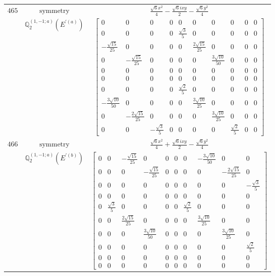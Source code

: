 \documentclass[fleqn,8pt,landscape]{jsarticle}
\begin{document}
\begin{longtable}{ccc}
$ 465 $ & $ \text{symmetry} $ & $ \frac{\sqrt{6} x^{2}}{4} - \frac{\sqrt{6} i x y}{2} - \frac{\sqrt{6} y^{2}}{4} $ \\
$  $ & $ \mathbb{Q}_{2}^{(1,-1;a)}(E^{\prime(a)}) $ & $ \begin{bmatrix} 0 & 0 & 0 & 0 & 0 & 0 & 0 & 0 & 0 & 0 \\ 0 & 0 & 0 & 0 & \frac{\sqrt{3}}{5} & 0 & 0 & 0 & 0 & 0 \\ - \frac{\sqrt{15}}{25} & 0 & 0 & 0 & 0 & \frac{2 \sqrt{15}}{25} & 0 & 0 & 0 & 0 \\ 0 & - \frac{\sqrt{15}}{25} & 0 & 0 & 0 & 0 & \frac{3 \sqrt{10}}{50} & 0 & 0 & 0 \\ 0 & 0 & 0 & 0 & 0 & 0 & 0 & 0 & 0 & 0 \\ 0 & 0 & 0 & 0 & 0 & 0 & 0 & 0 & 0 & 0 \\ 0 & 0 & 0 & 0 & \frac{\sqrt{2}}{5} & 0 & 0 & 0 & 0 & 0 \\ - \frac{3 \sqrt{10}}{50} & 0 & 0 & 0 & 0 & \frac{3 \sqrt{10}}{25} & 0 & 0 & 0 & 0 \\ 0 & - \frac{2 \sqrt{15}}{25} & 0 & 0 & 0 & 0 & \frac{3 \sqrt{10}}{25} & 0 & 0 & 0 \\ 0 & 0 & - \frac{\sqrt{3}}{5} & 0 & 0 & 0 & 0 & \frac{\sqrt{2}}{5} & 0 & 0 \end{bmatrix} $ \\ \hline
$ 466 $ & $ \text{symmetry} $ & $ \frac{\sqrt{6} x^{2}}{4} + \frac{\sqrt{6} i x y}{2} - \frac{\sqrt{6} y^{2}}{4} $ \\
$  $ & $ \mathbb{Q}_{2}^{(1,-1;a)}(E^{\prime(b)}) $ & $ \begin{bmatrix} 0 & 0 & - \frac{\sqrt{15}}{25} & 0 & 0 & 0 & 0 & - \frac{3 \sqrt{10}}{50} & 0 & 0 \\ 0 & 0 & 0 & - \frac{\sqrt{15}}{25} & 0 & 0 & 0 & 0 & - \frac{2 \sqrt{15}}{25} & 0 \\ 0 & 0 & 0 & 0 & 0 & 0 & 0 & 0 & 0 & - \frac{\sqrt{3}}{5} \\ 0 & 0 & 0 & 0 & 0 & 0 & 0 & 0 & 0 & 0 \\ 0 & \frac{\sqrt{3}}{5} & 0 & 0 & 0 & 0 & \frac{\sqrt{2}}{5} & 0 & 0 & 0 \\ 0 & 0 & \frac{2 \sqrt{15}}{25} & 0 & 0 & 0 & 0 & \frac{3 \sqrt{10}}{25} & 0 & 0 \\ 0 & 0 & 0 & \frac{3 \sqrt{10}}{50} & 0 & 0 & 0 & 0 & \frac{3 \sqrt{10}}{25} & 0 \\ 0 & 0 & 0 & 0 & 0 & 0 & 0 & 0 & 0 & \frac{\sqrt{2}}{5} \\ 0 & 0 & 0 & 0 & 0 & 0 & 0 & 0 & 0 & 0 \\ 0 & 0 & 0 & 0 & 0 & 0 & 0 & 0 & 0 & 0 \end{bmatrix} $ \\ \hline

\end{longtable}
\end{document}
